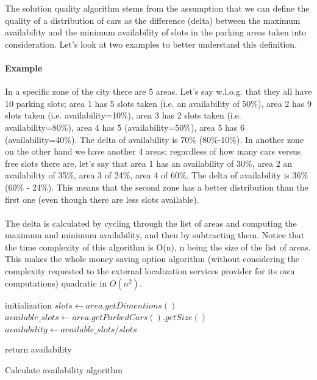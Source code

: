 The solution quality algorithm stems from the assumption that we can define the quality of a distribution of cars as the difference (delta) between the maximum availability and the minimum availability of slots in the parking areas taken into consideration. Let's look at two examples to better understand this definition.
\paragraph{Example}In a specific zone of the city there are 5 areas. Let's say w.l.o.g. that they all have 10 parking slots; area 1 has 5 slots taken (i.e. an availability of 50\%), area 2 has 9 slots taken (i.e. availability=10\%), area 3 has 2 slots taken (i.e. availability=80\%), area 4 has 5 (availability=50\%), area 5 has 6 (availability=40\%). The delta of availability is 70\% (80\%-10\%).
In another zone on the other hand we have another 4 areas; regardless of how many cars versus free slots there are, let's say that area 1 has an availability of 30\%, area 2 an availability of 35\%, area 3 of 24\%, area 4 of 60\%. The delta of availability is 36\% (60\% - 24\%). This means that the second zone has a better distribution than the first one (even though there are less slots available).
\paragraph{}The delta is calculated by cycling through the list of areas and computing the maximum and minimum availability, and then by subtracting them. Notice that the time complexity of this algorithm is O(n), n being the size of the list of areas. This makes the whole money saving option algorithm (without considering the complexity requested to the external localization services provider for its own computations) quadratic in $O(n^2)$.

\begin{algorithm}
	initialization\;
	$slots \leftarrow area.getDimentions()$\;
	$available\_slots \leftarrow area.getParkedCars().getSize()$\;
	$availability \leftarrow available\_slots / slots$\;
	
	return availability\;
	\caption{Calculate availability algorithm}
\end{algorithm}


